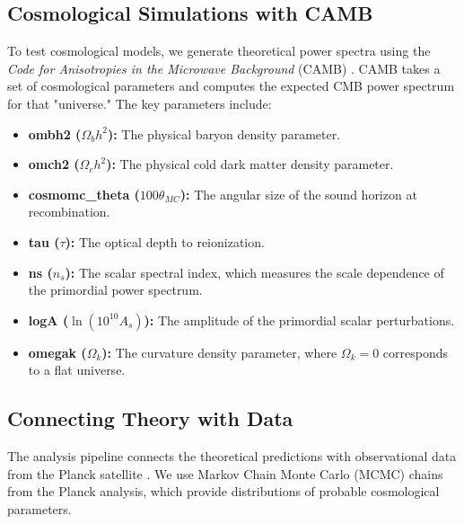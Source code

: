 \documentclass{article}
\theoremstyle{definition}
\begin{document}
\subsection{Cosmological Simulations with CAMB}
To test cosmological models, we generate theoretical power spectra using the \textit{Code for Anisotropies in the Microwave Background} (CAMB) \autocite{CAMB_GitHub}. CAMB takes a set of cosmological parameters and computes the expected CMB power spectrum for that "universe." The key parameters include:
\begin{itemize}[noitemsep,topsep=0pt]
  \item \textbf{ombh2 ($\Omega_b h^2$):} The physical baryon density parameter.
  \item \textbf{omch2 ($\Omega_c h^2$):} The physical cold dark matter density parameter.
  \item \textbf{cosmomc\_theta ($100\theta_{MC}$):} The angular size of the sound horizon at recombination.
  \item \textbf{tau ($\tau$):} The optical depth to reionization.
  \item \textbf{ns ($n_s$):} The scalar spectral index, which measures the scale dependence of the primordial power spectrum.
  \item \textbf{logA ($\ln(10^{10} A_s)$):} The amplitude of the primordial scalar perturbations.
  \item \textbf{omegak ($\Omega_k$):} The curvature density parameter, where $\Omega_k=0$ corresponds to a flat universe.
\end{itemize}

\subsection{Connecting Theory with Data}
The analysis pipeline connects the theoretical predictions with observational data from the Planck satellite \autocite{planck_legacy_archive, cosmoplanck_2020}. We use Markov Chain Monte Carlo (MCMC) chains from the Planck analysis, which provide distributions of probable cosmological parameters.
\end{document}
